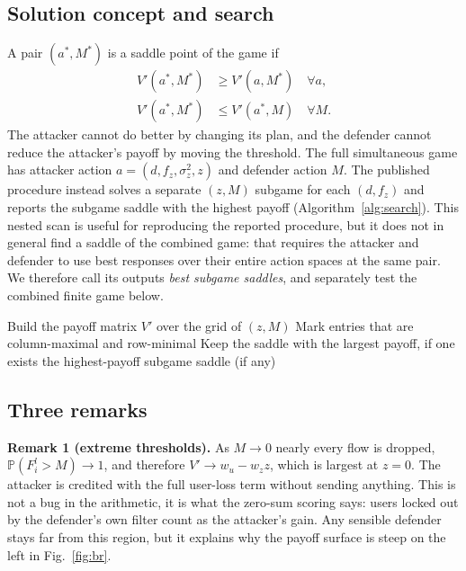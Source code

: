 \documentclass[conference]{IEEEtran}
\renewcommand{\Pr}{\mathbb{P}}
\begin{document}
\subsection{Solution concept and search}
A pair $(a^*,M^*)$ is a saddle point of the game if
\begin{align}
V'(a^*,M^*) &\ge V'(a,M^*)\quad\forall a,\\
V'(a^*,M^*) &\le V'(a^*,M)\quad\forall M.
\end{align}
The attacker cannot do better by changing its plan, and the defender cannot reduce the attacker's payoff by moving the threshold. The full simultaneous game has attacker action $a=(d,f_z,\sigma_z^2,z)$ and defender action $M$. The published procedure instead solves a separate $(z,M)$ subgame for each $(d,f_z)$ and reports the subgame saddle with the highest payoff (Algorithm~\ref{alg:search}). This nested scan is useful for reproducing the reported procedure, but it does not in general find a saddle of the combined game: that requires the attacker and defender to use best responses over their entire action spaces at the same pair. We therefore call its outputs \emph{best subgame saddles}, and separately test the combined finite game below.

\begin{algorithm}[t]
\caption{Nested scan of fixed-parameter subgames}
\label{alg:search}
\begin{algorithmic}[1]
  \State Build the payoff matrix $V'$ over the grid of $(z,M)$
  \State Mark entries that are column-maximal and row-minimal
  \State Keep the saddle with the largest payoff, if one exists
\EndFor
  \State \Return the highest-payoff subgame saddle (if any)
\end{algorithmic}
\end{algorithm}

\subsection{Three remarks}
\textbf{Remark 1 (extreme thresholds).} As $M\to 0$ nearly every flow is dropped, $\Pr(F^l_i>M)\to1$, and therefore $V'\to w_u-w_z z$, which is largest at $z{=}0$. The attacker is credited with the full user-loss term without sending anything. This is not a bug in the arithmetic, it is what the zero-sum scoring says: users locked out by the defender's own filter count as the attacker's gain. Any sensible defender stays far from this region, but it explains why the payoff surface is steep on the left in Fig.~\ref{fig:br}.
\end{document}
